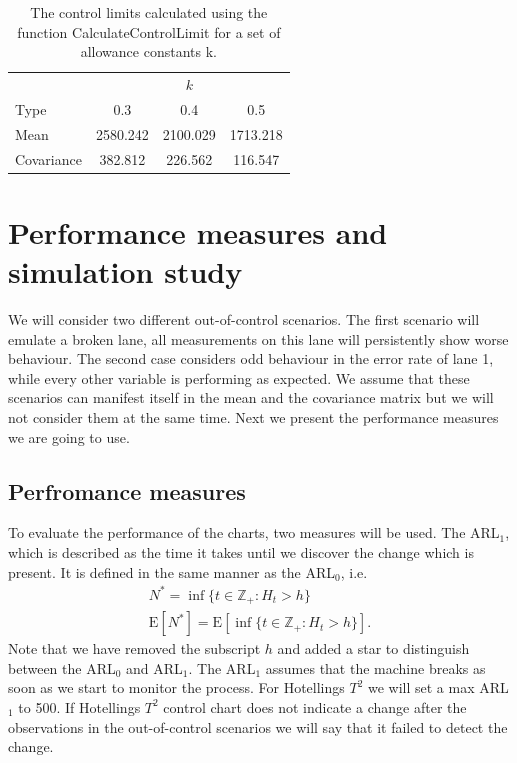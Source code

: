 \documentclass[a4paper,11pt,fleqn,twoside,notitlepage]{report}
\begin{document}
\begin{table}[ht]
\centering
\begin{tabular}{lccc}
\toprule
& \multicolumn{3}{c}{$k$} \\ \cmidrule(r){2-4} 
Type & 0.3 & 0.4 & 0.5 \\ 
\midrule
Mean & 2580.242 & 2100.029 & 1713.218 \\ 
\midrule
Covariance & 382.812 & 226.562 & 116.547 \\
\bottomrule
\end{tabular}
\caption{The control limits calculated using the function CalculateControlLimit for a set of allowance constants k.\label{Control}} 
\end{table}
\section{Performance measures and simulation study}
We will consider two different out-of-control scenarios. The first scenario will emulate a broken lane, all measurements on this lane will persistently show worse behaviour. The second case considers odd behaviour in the error rate of lane 1, while every other variable is performing as expected. We assume that these scenarios can manifest itself in the mean and the covariance matrix but we will not consider them at the same time. Next we present the performance measures we are going to use. 

\subsection{Perfromance measures}
To evaluate the performance of the charts, two measures will be used. The ARL$_1$, which is described as the time it takes until we discover the change which is present. It is defined in the same manner as the ARL$_0$, i.e.
\begin{align}
&N^*=\inf \{t \in \mathbb{Z}_+: H_t>h \}& \\\nonumber
&\text{E}[N^*] = \text{E}[\inf \{t \in \mathbb{Z}_+: H_t>h \}].& 
\end{align}
Note that we have removed the subscript $h$ and added a star to distinguish between the ARL$_0$ and ARL$_1$. The ARL$_1$ assumes that the machine breaks as soon as we start to monitor the process. For Hotellings $T^2$ we will set a max ARL$_1$ to 500. If Hotellings $T^2$ control chart does not indicate a change after the observations in the out-of-control scenarios we will say that it failed to detect the change.
\end{document}
